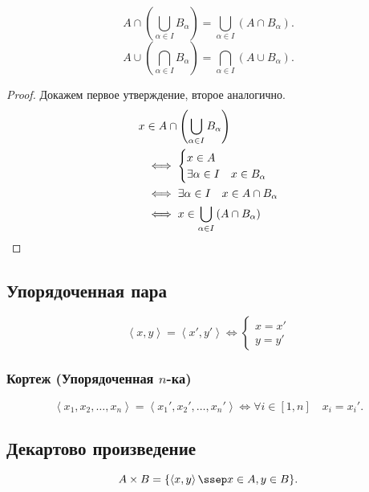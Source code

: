 \documentclass[11pt, oneside]{article}   	%
\begin{document}
        \begin{theorem}
            \[ A\cap\left( \bigcup\limits_{\alpha \in I}B_{\alpha} \right)=\bigcup\limits_{\alpha \in I}\left( A\cap B_{\alpha} \right)   .\] 
            \[ A\cup\left( \bigcap\limits_{\alpha \in I}B_{\alpha} \right) = \bigcap\limits_{\alpha \in I}\left( A\cup B_{\alpha} \right)   .\] 
            \begin{proof}
                Докажем первое утверждение, второе аналогично.\\
                \begin{equation*}
                    \begin{split}
                        x&\in A\cap \left( \bigcup_{\alpha\in I} B_{\alpha} \right)\\
                        &\iff \begin{cases}
                            x\in A\\
                            \exists{\alpha\in I}\quad x\in B_{\alpha}
                        \end{cases}\\
                        &\iff \exists{\alpha\in I}\quad x\in A\cap B_{\alpha}\\
                        &\iff x\in \bigcup_{\alpha\in I} \left( A\cap B_{\alpha} \right) \qedhere 
                    \end{split}
                \end{equation*}
            \end{proof}
        \end{theorem}
    \subsection{Упорядоченная пара}
        \begin{equation*}
            \left<x, y\right> = \left<x', y'\right> \iff \begin{cases}
                x = x'\\
                y = y'
            \end{cases}
        \end{equation*}
        \subsubsection{Кортеж (Упорядоченная $n$-ка)}
        \[ \left<x_1, x_2, \ldots, x_n\right> = \left<x_1', x_2', \ldots, x_n'\right> \iff \forall{i \in [1, n]}\quad x_i = x_i' .\] 
    \subsection{Декартово произведение}
        \[ A\times B = \{\left<x, y\right> \ssep x \in A, y \in B\}  .\] 
\end{document}
